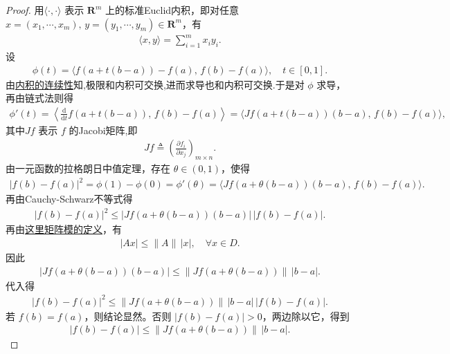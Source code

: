 \documentclass[../../main.tex]{subfiles}%
\begin{document}
\begin{proof}
用$\langle \cdot, \cdot \rangle$ 表示 $\mathbf{R}^m$ 上的标准Euclid内积，即对任意 $x=(x_1,\cdots,x_m),\, y=(y_1,\cdots,y_m)\in \mathbf{R}^m$，有
\begin{align*}
\langle x,y\rangle = \sum_{i=1}^m x_i y_i.
\end{align*}
设
\begin{align*}
\phi (t) = \langle f(a + t(b - a)) - f(a),\, f(b) - f(a)\rangle ,\quad t\in [0,1].
\end{align*}
由\hyperref[Functional Analysis-proposition:内积的连续性]{内积的连续性}知,极限和内积可交换,进而求导也和内积可交换.于是对 $\phi$ 求导，再由链式法则得
\begin{align*}
\phi'(t) = \left\langle \frac{\mathrm{d}}{\mathrm{d}t} f(a+t(b-a)),\, f(b)-f(a) \right\rangle = \langle Jf(a+t(b-a))(b-a), \,f(b)-f(a)\rangle ,
\end{align*}
其中$Jf$ 表示 $f$ 的Jacobi矩阵,即
\begin{align*}
Jf\triangleq \left(\frac{\partial f_i}{\partial x_j}\right)_{m\times n}.
\end{align*}
由一元函数的拉格朗日中值定理，存在 $\theta \in (0,1)$，使得
\begin{align*}
|f(b) - f(a)|^2 =\phi(1) - \phi(0) = \phi'(\theta)= \langle Jf(a+\theta(b-a))(b-a), \,f(b)-f(a)\rangle .
\end{align*}
再由Cauchy-Schwarz不等式得
\begin{align*}
|f(b) - f(a)|^2 \leqslant |Jf(a + \theta (b - a))(b - a)|\, |f(b) - f(a)|.
\end{align*}
再由\hyperref[Functional Analysis-proposition:有界线性算子的基本不等式]{这里矩阵模的定义}，有
\begin{align*}
|Ax| \leqslant \|A\|\, |x|,\quad \forall x\in D.
\end{align*}
因此
\begin{align*}
|Jf(a + \theta (b - a))(b - a)| \leqslant \|Jf(a + \theta (b - a))\|\, |b - a|.
\end{align*}
代入得
\begin{align*}
|f(b) - f(a)|^2 \leqslant \|Jf(a + \theta (b - a))\|\, |b - a|\, |f(b) - f(a)|.
\end{align*}
若 $f(b)=f(a)$，则结论显然。否则 $|f(b)-f(a)|>0$，两边除以它，得到
\begin{align*}
|f(b) - f(a)| \leqslant \|Jf(a + \theta (b - a))\|\, |b - a|.
\end{align*}
\end{proof}
\end{document}

